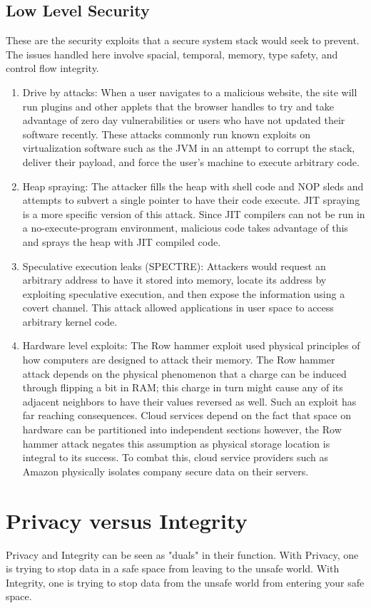 \documentclass[twoside]{article}
\begin{document}
\subsection{Low Level Security}
These are the security exploits that a secure system stack would seek to prevent. The issues handled here involve spacial, temporal, memory, type safety, and control flow integrity. \\
\begin{enumerate}
    \item Drive by attacks: When a user navigates to a malicious website, the site will run plugins and other applets that the browser handles to try and take advantage of zero day vulnerabilities or users who have not updated their software recently. These attacks commonly run known exploits on virtualization software such as the JVM in an attempt to corrupt the stack, deliver their payload, and force the user's machine to execute arbitrary code.
    \item Heap spraying: The attacker fills the heap with shell code and NOP sleds and attempts to subvert a single pointer to have their code execute. JIT spraying is a more specific version of this attack. Since JIT compilers can not be run in a no-execute-program environment, malicious code takes advantage of this and sprays the heap with JIT compiled code.
    \item Speculative execution leaks (SPECTRE): Attackers would request an arbitrary address to have it stored into memory, locate its address by exploiting speculative execution, and then expose the information using a covert channel. This attack allowed applications in user space to access arbitrary kernel code.
    \item Hardware level exploits: The Row hammer exploit used physical principles of how computers are designed to attack their memory. The Row hammer attack depends on the physical phenomenon that a charge can be induced through flipping a bit in RAM; this charge in turn might cause any of its adjacent neighbors to have their values reversed as well. Such an exploit has far reaching consequences. Cloud services depend on the fact that space on hardware can be partitioned into independent sections however, the Row hammer attack negates this assumption as physical storage location is integral to its success. To combat this, cloud service providers such as Amazon physically isolates company secure data on their servers.
\end{enumerate}


\section{Privacy versus Integrity}
Privacy and Integrity can be seen as "duals" in their function. With Privacy, one is trying to stop data in a safe space from leaving to the unsafe world. With Integrity, one is trying to stop data from the unsafe world from entering your safe space.
\end{document}

